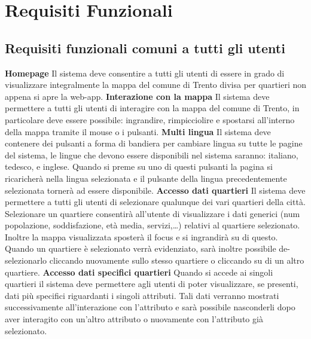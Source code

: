 \chapter{Requisiti Funzionali} 
    \section{Requisiti funzionali comuni a tutti gli utenti}
        \begin{rfList}
            \rfItem \textbf{Homepage} Il sistema deve consentire a tutti gli utenti di essere in grado di visualizzare integralmente la mappa del comune di Trento divisa per quartieri non appena si apre la web-app.
            \rfItem \textbf{Interazione con la mappa} Il sistema deve permettere a tutti gli utenti di interagire con la mappa del comune di Trento, in particolare deve essere possibile: ingrandire, rimpicciolire e spostarsi all'interno della mappa tramite il mouse o i pulsanti.
            \rfItem \textbf{Multi lingua} Il sistema deve contenere dei pulsanti a forma di bandiera per cambiare lingua su tutte le pagine del sistema, le lingue che devono essere disponibili nel sistema saranno: italiano, tedesco, e inglese. Quando si preme su uno di questi pulsanti la pagina si ricaricherà nella lingua selezionata e il pulsante della lingua precedentemente selezionata tornerà ad essere disponibile.
            \rfItem \textbf{Accesso dati quartieri} Il sistema deve permettere a tutti gli utenti di selezionare qualunque dei vari quartieri della città. Selezionare un quartiere consentirà all'utente di visualizzare i dati generici (num popolazione, soddisfazione, età media, servizi,\dots) relativi al quartiere selezionato. Inoltre la mappa visualizzata sposterà il focus e si ingrandirà su di questo. Quando un quartiere è selezionato verrà evidenziato, sarà inoltre possibile de-selezionarlo cliccando nuovamente sullo stesso quartiere o cliccando su di un altro quartiere.
            \rfItem \textbf{Accesso dati specifici quartieri} Quando si accede ai singoli quartieri il sistema deve permettere agli utenti di poter visualizzare, se presenti, dati più specifici riguardanti i singoli attributi. Tali dati verranno mostrati successivamente all'interazione con l'attributo e sarà possibile nasconderli dopo aver interagito con un'altro attributo o nuovamente con l'attributo già selezionato.
        \end{rfList} 
